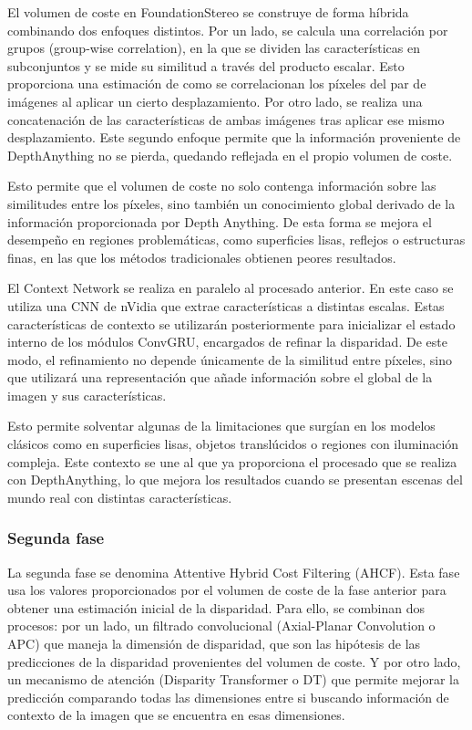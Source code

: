 El volumen de coste en FoundationStereo se construye de forma híbrida combinando dos enfoques distintos. Por un lado, se calcula una correlación por grupos (group-wise correlation), en la que se dividen las características en subconjuntos y se mide su similitud a través del producto escalar. Esto proporciona una estimación de como se correlacionan los píxeles del par de imágenes al aplicar un cierto desplazamiento. Por otro lado, se realiza una concatenación de las características de ambas imágenes tras aplicar ese mismo desplazamiento. Este segundo enfoque permite que la información proveniente de DepthAnything no se pierda, quedando reflejada en el propio volumen de coste.

Esto permite que el volumen de coste no solo contenga información sobre las similitudes entre los píxeles, sino también un conocimiento global derivado de la información proporcionada por Depth Anything. De esta forma se mejora el desempeño en regiones problemáticas, como superficies lisas, reflejos o estructuras finas, en las que los métodos tradicionales obtienen peores resultados.

El Context Network se realiza en paralelo al procesado anterior. En este caso se utiliza una CNN de nVidia que extrae características a distintas escalas. Estas características de contexto se utilizarán posteriormente para inicializar el estado interno de los módulos ConvGRU, encargados de refinar la disparidad. De este modo, el refinamiento no depende únicamente de la similitud entre píxeles, sino que utilizará una representación que añade información sobre el global de la imagen y sus características.

Esto permite solventar algunas de la limitaciones que surgían en los modelos clásicos como en superficies lisas, objetos translúcidos o regiones con iluminación compleja. Este contexto se une al que ya proporciona el procesado que se realiza con DepthAnything, lo que mejora los resultados cuando se presentan escenas del mundo real con distintas características.

\subsubsection{Segunda fase}
La segunda fase se denomina Attentive Hybrid Cost Filtering (AHCF). Esta fase usa los valores proporcionados por el volumen de coste de la fase anterior para obtener una estimación inicial de la disparidad. Para ello, se combinan dos procesos: por un lado, un filtrado convolucional (Axial-Planar Convolution o APC) que maneja la dimensión de disparidad, que son las hipótesis de las predicciones de la disparidad provenientes del volumen de coste. Y por otro lado, un mecanismo de atención (Disparity Transformer o DT) que permite mejorar la predicción comparando todas las dimensiones entre si buscando información de contexto de la imagen que se encuentra en esas dimensiones.

